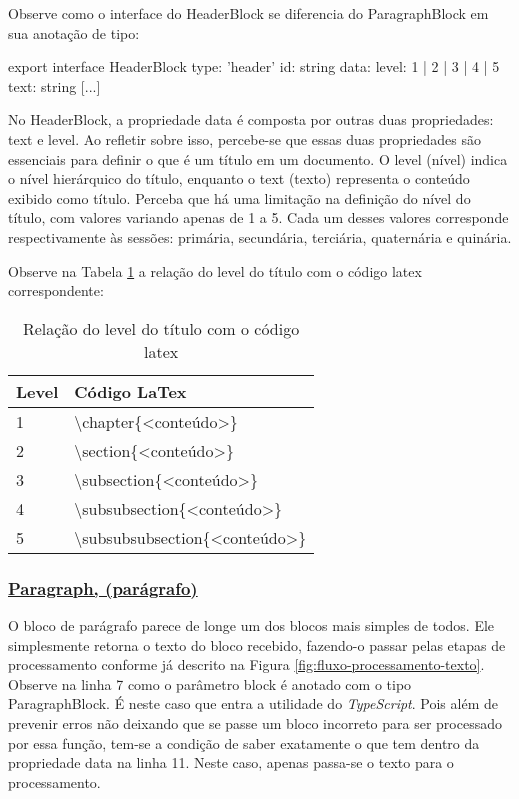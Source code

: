 Observe como o interface do HeaderBlock se diferencia
do ParagraphBlock em sua anotação de tipo:

\begin{HeaderBlockCode}
[...]
export interface HeaderBlock {
    type: 'header'
    id: string
    data: {
        level: 1 | 2 | 3 | 4 | 5
        text: string
    }
}
[...]
\end{HeaderBlockCode}

No HeaderBlock, a propriedade data é composta por outras duas propriedades: text e level.
Ao refletir sobre isso, percebe-se que essas duas propriedades são essenciais para definir
o que é um título em um documento. O level (nível) indica o nível hierárquico do título,
enquanto o text (texto) representa o conteúdo exibido como título. Perceba que há uma
limitação na definição do nível do título, com valores variando apenas de 1 a 5.
Cada um desses valores corresponde respectivamente às sessões: primária, secundária, terciária, quaternária e quinária.

Observe na
            Tabela \ref{tbl:header-level-latex}
            a relação do level do título com o código
            \acrshort{latex}
            correspondente:

\begin{table}[H]
    \centering
    \caption{Relação do level do título com o código latex}
    \label{tbl:header-level-latex}
    \renewcommand{\arraystretch}{1.5}
    \begin{tabular}{p{1.0320cm} p{5.8480cm}}
        \hline
        \textbf{Level} & \textbf{Código LaTex} \\
        \hline
        1 & \textbackslash chapter\{<conteúdo>\} \\
		2 & \textbackslash section\{<conteúdo>\} \\
		3 & \textbackslash subsection\{<conteúdo>\} \\
		4 & \textbackslash subsubsection\{<conteúdo>\} \\
		5 & \textbackslash subsubsubsection\{<conteúdo>\} \\
        \hline
        
    \end{tabular}
\end{table}

\subsubsection{\underline{Paragraph, (parágrafo)}}

O bloco de parágrafo parece de longe um dos blocos mais simples de todos.
Ele simplesmente retorna o texto do bloco recebido, fazendo-o passar
pelas etapas de processamento conforme já descrito na
Figura \ref{fig:fluxo-processamento-texto}.
Observe na linha 7 como o parâmetro block é anotado com o tipo ParagraphBlock.
É neste caso que entra a utilidade do \textit{TypeScript}. Pois além de prevenir erros
não deixando que se passe um bloco incorreto para ser processado por essa função,
tem-se a condição de saber exatamente o que tem dentro da propriedade
data na linha 11. Neste caso, apenas passa-se o texto para o processamento.

